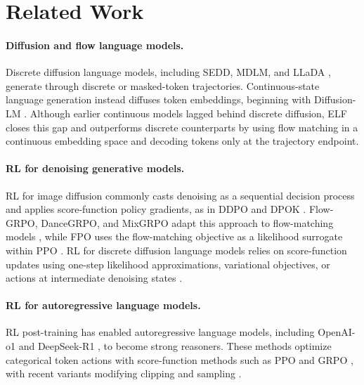 \section{Related Work}
\label{sec:related}

\paragraph{Diffusion and flow language models.}
Discrete diffusion language models, including SEDD, MDLM, and LLaDA \citep{lou2023sedd,sahoo2024mdlm,nie2025llada}, generate through discrete or masked-token trajectories. Continuous-state language generation instead diffuses token embeddings, beginning with Diffusion-LM \citep{li2022diffusionlm}. Although earlier continuous models lagged behind discrete diffusion, ELF \citep{hu2026elf} closes this gap and outperforms discrete counterparts by using flow matching \citep{lipman2022flow,liu2022rectified,albergo2023stochastic} in a continuous embedding space and decoding tokens only at the trajectory endpoint.

\paragraph{RL for denoising generative models.}
RL for image diffusion commonly casts denoising as a sequential decision process and applies score-function policy gradients, as in DDPO and DPOK \citep{black2023ddpo,fan2023dpok}. Flow-GRPO, DanceGRPO, and MixGRPO adapt this approach to flow-matching models \citep{liu2025flowgrpo,xue2025dancegrpo,li2025mixgrpo}, while FPO uses the flow-matching objective as a likelihood surrogate within PPO \citep{mcallister2025fpo}. RL for discrete diffusion language models relies on score-function updates using one-step likelihood approximations, variational objectives, or actions at intermediate denoising states \citep{zhao2025d1,zhu2025llada15,shao2026papo}. 

\paragraph{RL for autoregressive language models.}
RL post-training has enabled autoregressive language models, including OpenAI-o1 \citep{openai2024o1} and DeepSeek-R1 \citep{deepseek2025r1}, to become strong reasoners. These methods optimize categorical token actions with score-function methods such as PPO and GRPO \citep{shao2024deepseekmath,schulman2017ppo}, with recent variants modifying clipping and sampling \citep{yu2025dapo,zheng2025gspo}. 


